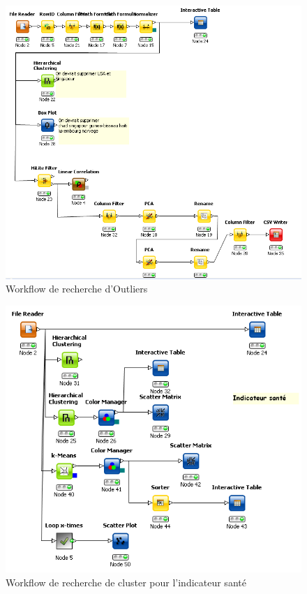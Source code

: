\begin{figure}[H]
	\begin{center}
		\includegraphics[scale=0.5]{Image/workflowOutlier}
		\caption{Workflow de recherche d'Outliers}
	\end{center}
\end{figure}
\begin{figure}[H]
	\begin{center}
		\includegraphics[scale=0.5]{Image/WorkflowClusteringSante}
		\caption{Workflow de recherche de cluster pour l'indicateur santé}
	\end{center}
\end{figure}
